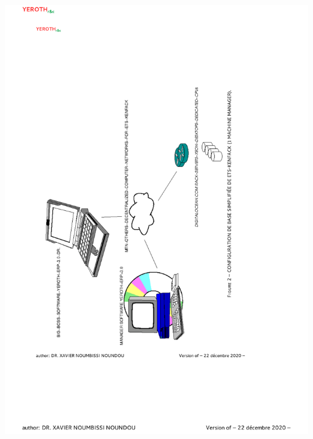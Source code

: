\begin{center}
\includegraphics[scale=0.81]{images/yeroth-sample-decentralized-multi-sites-supermarket.pdf}
\label{fig:sample-decentralized-multi-sites-supermarket}
\end{center}
